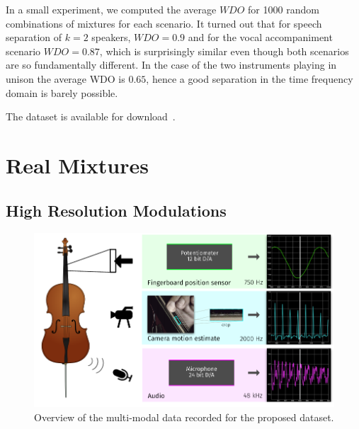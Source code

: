 In a small experiment, we computed the average \(WDO\) for 1000 random combinations of mixtures for each scenario.
It turned out that for speech separation of \(k=2\) speakers, \(WDO=0.9\) and for the vocal accompaniment scenario \(WDO=0.87\), which is surprisingly similar even though both scenarios are so fundamentally different.
In the case of the two instruments playing in unison the average WDO is \(0.65\), hence a good separation in the time frequency domain is barely possible.

The dataset is available for download~\cite{oss_unison}.


\section{Real Mixtures}

\subsection{High Resolution Modulations}

\begin{figure}[h]
  \centering
  \includegraphics[width=\textwidth]{Chapters/04_Data/figures/teaser.pdf}
  \caption{Overview of the multi-modal data recorded for the proposed dataset.}
\label{fig:teaser}
\end{figure}

